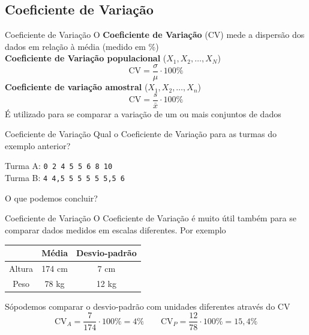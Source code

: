 \documentclass[10pt]{beamer}\usepackage[]{graphicx}\usepackage[]{color}
\theoremstyle{definition}
\begin{document}
\subsection{Coeficiente de Variação}

\begin{frame}{Coeficiente de Variação}
  O \textbf{Coeficiente de Variação} (CV) mede a dispersão dos dados em
  relação à média (medido em \%)\\ \vspace{1em}
  \textbf{Coeficiente de Variação populacional} ($X_1, X_2, \ldots, X_N$)
  \begin{equation*}
    \text{CV} = \frac{\sigma}{\mu} \cdot 100\%
  \end{equation*}
  \vspace{1em}
    \textbf{Coeficiente de variação amostral} ($X_1, X_2, \ldots, X_n$)
  \begin{equation*}
    \text{CV} = \frac{s}{\bar{x}} \cdot 100\%
  \end{equation*}
  É utilizado para se comparar a variação de um ou mais conjuntos de
  dados
\end{frame}

\begin{frame}{Coeficiente de Variação}
  Qual o Coeficiente de Variação para as turmas do exemplo anterior?
  \begin{center}
    Turma A: \texttt{0 2 4 5 5 6 8 10} \\ \vspace{1em}
    Turma B: \texttt{4 4,5 5 5 5 5 5,5 6}
  \end{center}
  O que podemos concluir?
\end{frame}

\begin{frame}{Coeficiente de Variação}
  O Coeficiente de Variação é muito útil também para se comparar dados
  medidos em escalas diferentes. Por exemplo
  \begin{table}[h]
    \centering
    \begin{tabular}{ccc}
      \hline
            & Média & Desvio-padrão \\
            \hline
            Altura & 174 cm & 7 cm \\
            Peso & 78 kg & 12 kg \\
            \hline
    \end{tabular}
  \end{table}
  Sópodemos comparar o desvio-padrão com unidades diferentes através do CV
  \begin{equation*}
    \text{CV}_A = \frac{7}{174} \cdot 100\% =  4\%
    \quad \quad \text{CV}_P = \frac{12}{78} \cdot 100\% = 15,4\%
  \end{equation*}
\end{frame}
\end{document}
